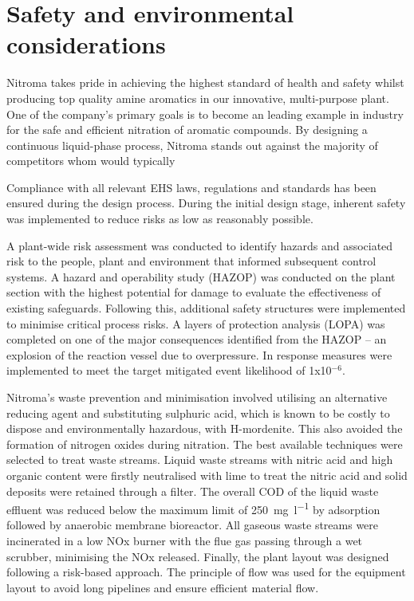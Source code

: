 \section*{Safety and environmental considerations}

Nitroma takes pride in achieving the highest standard of health and safety whilst producing top quality amine aromatics in our innovative, multi-purpose plant. One of the company's primary goals is to become an leading example in industry for the safe and efficient nitration of aromatic compounds. By designing a continuous liquid-phase process, Nitroma stands out against the majority of competitors whom would typically  

 


 Compliance with all relevant EHS laws, regulations and standards has been ensured during the design process. During the initial design stage, inherent safety was implemented to reduce risks as low as reasonably possible. 
 
 A plant-wide risk assessment was conducted to identify hazards and associated risk to the people, plant and environment that informed subsequent control systems. A hazard and operability study (HAZOP) was conducted on the plant section with the highest potential for damage to evaluate the effectiveness of existing safeguards. Following this, additional safety structures were implemented to minimise critical process risks. A layers of protection analysis (LOPA) was completed on one of the major consequences identified from the HAZOP – an explosion of the reaction vessel due to overpressure. In response measures were implemented to meet the target mitigated event likelihood of 1x10$^{-6}$.  

Nitroma's waste prevention and minimisation involved utilising an alternative reducing agent and substituting sulphuric acid, which is known to be costly to dispose and environmentally hazardous, with H-mordenite. This also avoided the formation of nitrogen oxides during nitration. The best available techniques  were selected to treat waste streams. Liquid waste streams with nitric acid and high organic content were firstly neutralised with lime to treat the nitric acid and solid deposits were retained through a filter. The overall COD of the liquid waste effluent was reduced below the maximum limit of \SI{250}{\mg\per\litre} by adsorption followed by anaerobic membrane bioreactor. All gaseous waste streams were incinerated in a low NOx burner with the flue gas passing through a wet scrubber, minimising the NOx released. Finally, the plant layout was designed following a risk-based approach. The principle of flow was used for the equipment layout to avoid long pipelines and ensure efficient material flow. 